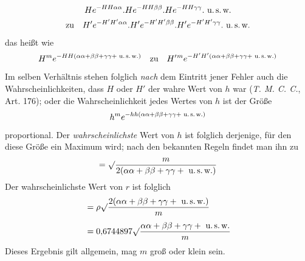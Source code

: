 \[
\begin{gathered}
He^{-HH\alpha\alpha}.He^{-HH\beta\beta}.He^{-HH\gamma\gamma}.\text{ u.\,s.\,w.}\\
\text{zu}\quad H'e^{-H'H'\alpha\alpha}.H'e^{-H'H'\beta\beta}.H'e^{-H'H'\gamma\gamma}.\text{ u.\,s.\,w.}
\end{gathered}
\]
das heißt wie
\[
H^m e^{-HH(\alpha\alpha+\beta\beta+\gamma\gamma+\text{ u.\,s.\,w.})}\quad\text{zu}\quad
H'{}^m e^{-H'H'(\alpha\alpha+\beta\beta+\gamma\gamma+\text{ u.\,s.\,w.})}
\]
Im selben Verhältnis stehen folglich \textit{nach} dem Eintritt jener Fehler auch die Wahrscheinlichkeiten, dass \(H\) oder \(H'\) der wahre Wert von \(h\) war (\textit{T. M. C. C.}, Art. 176); oder die Wahrscheinlichkeit jedes Wertes von \(h\) ist der Größe
\[
h^m e^{-hh(\alpha\alpha+\beta\beta+\gamma\gamma+\text{ u.\,s.\,w.})}
\]
proportional. Der \textit{wahrscheinlichste} Wert von \(h\) ist folglich derjenige, für den diese Größe ein Maximum wird; nach den bekannten Regeln findet man ihn zu
\[
=\surd\frac{m}{2(\alpha\alpha+\beta\beta+\gamma\gamma+\text{ u.\,s.\,w.})}
\]
Der wahrscheinlichste Wert von \(r\) ist folglich
\[
\begin{aligned}
&=\rho\surd\frac{2(\alpha\alpha+\beta\beta+\gamma\gamma+\text{ u.\,s.\,w.})}{m}\\[4pt]
&=0{,}6744897\surd\frac{\alpha\alpha+\beta\beta+\gamma\gamma+\text{ u.\,s.\,w.}}{m}
\end{aligned}
\]
Dieses Ergebnis gilt allgemein, mag \(m\) groß oder klein sein.

